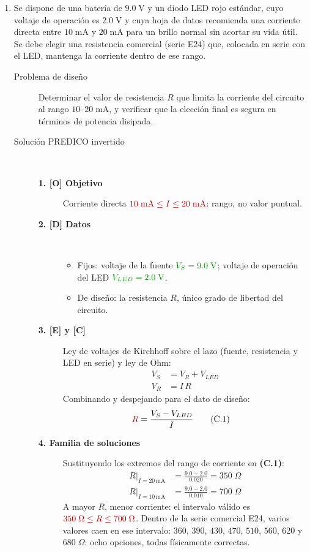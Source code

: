 \documentclass[11pt]{book}
\newcommand{\dato}[1]{\textcolor{colDatos}{#1}}
\newcommand{\incog}[1]{\textcolor{colIncog}{#1}}
\begin{document}
\begin{enumerate}
\item Se dispone de una batería de $9.0\;\text{V}$ y un diodo LED rojo estándar, cuyo voltaje de operación es $2.0\;\text{V}$ y cuya hoja de datos recomienda una corriente directa entre $10\;\text{mA}$ y $20\;\text{mA}$ para un brillo normal sin acortar su vida útil. Se debe elegir una resistencia comercial (serie E24) que, colocada en serie con el LED, mantenga la corriente dentro de ese rango.

\begin{description}
\item[Problema de diseño]
Determinar el valor de resistencia $R$ que limita la corriente del circuito al rango $10$--$20\;\text{mA}$, y verificar que la elección final es segura en términos de potencia disipada.

\item[Solución PREDICO invertido]~

\begin{description}
    \item[\textbf{1. [O] Objetivo}] Corriente directa $\incog{10\;\text{mA} \le I \le 20\;\text{mA}}$: rango, no valor puntual.

    \item[\textbf{2. [D] Datos}]~
    \begin{itemize}
        \item Fijos: voltaje de la fuente $\dato{V_S = 9.0\;\text{V}}$; voltaje de operación del LED $\dato{V_{LED} = 2.0\;\text{V}}$.
        \item De diseño: la resistencia $R$, único grado de libertad del circuito.
    \end{itemize}

    \item[\textbf{3. [E] y [C]}] Ley de voltajes de Kirchhoff sobre el lazo (fuente, resistencia y LED en serie) y ley de Ohm:
    \begin{align}
        V_S &= V_R + V_{LED} \tag{E.1}\\
        V_R &= I\,R \tag{E.2}
    \end{align}
    Combinando y despejando para el dato de diseño:
    \begin{align}
        \incog{R} &= \frac{V_S - V_{LED}}{I} \tag{C.1}
    \end{align}

    \item[\textbf{4. Familia de soluciones}] Sustituyendo los extremos del rango de corriente en \textbf{(C.1)}:
    \begin{align*}
        R\big|_{I=20\,\text{mA}} &= \frac{9.0-2.0}{0.020} = 350\;\Omega \\
        R\big|_{I=10\,\text{mA}} &= \frac{9.0-2.0}{0.010} = 700\;\Omega
    \end{align*}
    A mayor $R$, menor corriente: el intervalo válido es $\incog{350\;\Omega \le R \le 700\;\Omega}$. Dentro de la serie comercial E24, varios valores caen en ese intervalo: $360$, $390$, $430$, $470$, $510$, $560$, $620$ y $680\;\Omega$: ocho opciones, todas físicamente correctas.


\end{description}
\end{description}
\end{enumerate}
\end{document}
